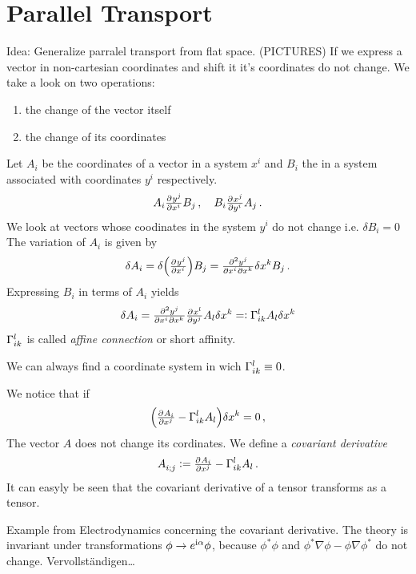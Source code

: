 \section{Parallel Transport}
Idea: Generalize parralel transport from flat space.
(PICTURES) 
If we express a vector in non-cartesian coordinates and shift it it's
coordinates do not change.
We take a look on two operations:
\begin{enumerate}
\item the change of the vector itself
\item the change of its coordinates
\end{enumerate}
Let $A_i$ be the coordinates of a vector in a system $x^i$ and $B_i$ the in a
system associated with coordinates $y^i$ respectively.
\begin{equation}
A_i\pd{{y^j}}{{x^i}}B_j\, ,\quad B_i\pd{{x^j}}{{y^i}}A_j\, .
\end{equation}
We look at vectors whose coodinates in the system $y^i$ do not change i.e.
$\delta B_i=0$ The variation of $A_i$ is given by
\begin{equation}
\delta
A_i=\delta\left(\pd{{y^j}}{{x^i}}\right)B_j
=\md{{y^j}}{2}{{x^i}}{}{{x^k}}{}\delta
x^k B_j\, .
\end{equation}
Expressing $B_i$ in terms of $A_i$ yields
\begin{equation}
\delta A_i = \md{{y^j}}{2}{{x^i}}{}{{x^k}}{}\pd{{x^l}}{{y^j}}A_l\delta x^k
=:\affin{l}{i}{k}A_l\delta x^k
\end{equation}
$\Gamma^{l}_{i k}$ is called \emph{affine connection} or short affinity.
\begin{remark}
We can always find a coordinate system in wich $\Gamma^{l}_{i k}\equiv 0$.  
\end{remark}
We notice that if 
\begin{equation}
\left(\pd{{A_i}}{{x^j}}-\affin{l}{i}{k}A_l\right)\delta x^k = 0\, ,
\end{equation}
The vector $A$ does not change its cordinates. We define a \emph{covariant
derivative} 
\begin{equation}
\tensor{A}{_i_;_j}:=\pd{{A_i}}{{x^j}}-\affin{l}{i}{k}A_l\, .
\end{equation}
It can easyly be seen that the covariant derivative of a tensor transforms as a
tensor. 
\begin{remark} Example from Electrodynamics concerning the covariant derivative. 
The theory is invariant under transformations $\phi\to e^{\mathrm{i} \alpha}\phi$, 
because $\phi^*\phi$ and $\phi^*\nabla\phi-\phi\nabla\phi^*$ do not change.
Vervollständigen\ldots
\end{remark}

